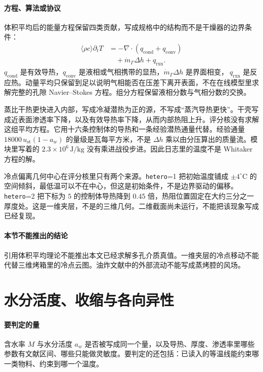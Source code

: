 \paragraph{方程、算法或协议}
体积平均后的能量方程保留四类贡献，写成规格中的结构而不是干燥器的边界条件：
\begin{align*}
\langle\rho c\rangle\partial_t T
&=-\nabla\cdot(q_{\mathrm{cond}}+q_{\mathrm{conv}})\\
&\quad+\dot m_\Gamma\Delta h+q_{\mathrm{rxn}}.
\end{align*}
$q_{\mathrm{cond}}$ 是有效导热，$q_{\mathrm{conv}}$ 是液相或气相携带的显热，$\dot m_\Gamma\Delta h$ 是界面相变，$\ q_{\mathrm{rxn}}$ 是反应热。动量平均只保留到足以说明气相能否在压差下离开表面，不在在线模型里求解完整的孔隙 Navier–Stokes 方程。组分方程保留液相分数与气相分数的交换。

蒸比干热更快进入内部，写成冷凝潜热为正的源，不写成“蒸汽导热更快”。干壳写成近表面渗透率下降，以及有效导热率下降，从而内部热阻上升。评分核没有求解这组平均方程。它用十六条控制体的导热和一条经验潜热通量代替。经验通量 $18000\,u_{\mathrm{st}}(1-a_w)$ 的量级是瓦每平方米，不是 $\Delta h$ 乘以由分压算出的质量流。模块里写着的 $2.3\times 10^{6}\,\mathrm{J/kg}$ 没有乘进战役步进。因此日志里的温度不是 Whitaker 方程的解。

冷点偏离几何中心在评分核里只有两个来源。\texttt{hetero}=1 把初始温度铺成 $\pm 4^\circ\mathrm{C}$ 的空间倾斜，最低温可以不在中心，但这是初始条件，不是边界驱动的偏移。\texttt{hetero}=2 把下标为 $5$ 的控制体导热降到 $0.45$ 倍，热阻位置固定在大约三分之一厚度处。这是一维夹层，不是\cite{feyissa2013}的三维几何。二维截面尚未运行，不能把该现象写成已经复现。

\paragraph{本节不能推出的结论}
引用体积平均理论不能推出本文已经求解多孔介质真值。一维夹层的冷点移动不能代替三维烤箱里的冷点云图。油炸文献中的外部流动不能写成蒸烤腔的风场。

\section{水分活度、收缩与各向异性}

\paragraph{要判定的量}
含水率 $M$ 与水分活度 $a_w$ 是否被写成同一个量，以及导热、厚度、渗透率里哪些参数有文献区间、哪些只能做灵敏度。要判定的还包括：已读入的等温线能约束哪一类物料、约束到哪一个温度。

